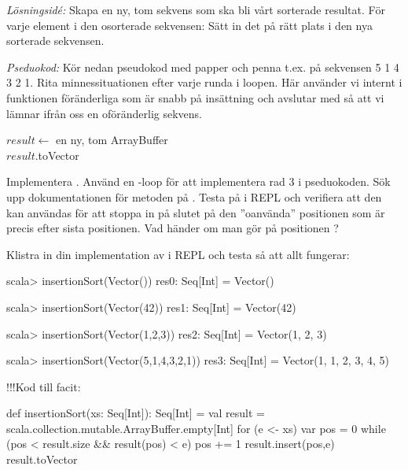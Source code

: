 \emph{Lösningsidé:} Skapa en ny, tom sekvens som ska bli vårt sorterade resultat. För varje element i den osorterade sekvensen: Sätt in det på rätt plats i den nya sorterade sekvensen.   

\Subtask \emph{Pseduokod:} Kör nedan pseudokod med papper och penna t.ex. på sekvensen 5 1 4 3 2 1. Rita minnessituationen efter varje runda i loopen. Här använder vi internt i funktionen föränderliga  som är snabb på insättning och avslutar med  så att vi lämnar ifrån oss en oföränderlig sekvens.

\begin{algorithm}[H]
    $result \leftarrow$ en ny, tom ArrayBuffer \\
    $result$.toVector
\end{algorithm}


\Subtask Implementera . Använd en -loop för att implementera rad 3 i pseduokoden. Sök upp dokumentationen för metoden  på . Testa   på  i REPL och verifiera att den kan användas för att stoppa in på slutet på den ''oanvända'' positionen som är precis efter sista positionen. Vad händer om man gör  på positionen ? 

Klistra in din implementation av  i REPL och testa så att allt fungerar:
\begin{REPL}
scala> insertionSort(Vector())
res0: Seq[Int] = Vector()

scala> insertionSort(Vector(42))
res1: Seq[Int] = Vector(42)

scala> insertionSort(Vector(1,2,3))
res2: Seq[Int] = Vector(1, 2, 3)

scala> insertionSort(Vector(5,1,4,3,2,1))
res3: Seq[Int] = Vector(1, 1, 2, 3, 4, 5)
\end{REPL}


!!!Kod till facit:
\begin{Code}[numbers=left]
def insertionSort(xs: Seq[Int]): Seq[Int] = {
  val result = scala.collection.mutable.ArrayBuffer.empty[Int]
  for (e <- xs) {
    var pos = 0
    while (pos < result.size && result(pos) < e) pos += 1
    result.insert(pos,e)
  }
  result.toVector
}
\end{Code}





